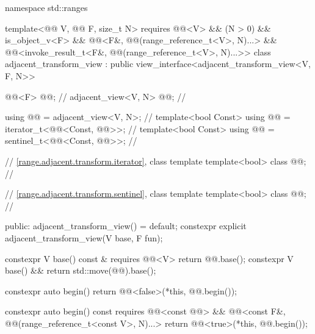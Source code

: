 %
%
%
%
%
%
\begin{codeblock}
namespace std::ranges {
  template<@@ V, @@ F, size_t N>
    requires @@<V> && (N > 0) && is_object_v<F> &&
             @@<F&, @@(range_reference_t<V>, N)...> &&
             @@<invoke_result_t<F&, @@(range_reference_t<V>, N)...>>
  class adjacent_transform_view : public view_interface<adjacent_transform_view<V, F, N>> {
    @@<F> @@;                        // \expos
    adjacent_view<V, N> @@;                 // \expos

    using @@ = adjacent_view<V, N>;      // \expos
    template<bool Const>
      using @@ = iterator_t<@@<Const, @@>>;         // \expos
    template<bool Const>
      using @@ = sentinel_t<@@<Const, @@>>;         // \expos

    // \ref{range.adjacent.transform.iterator}, class template 
    template<bool> class @@;              // \expos

    // \ref{range.adjacent.transform.sentinel}, class template 
    template<bool> class @@;              // \expos

  public:
    adjacent_transform_view() = default;
    constexpr explicit adjacent_transform_view(V base, F fun);

    constexpr V base() const & requires @@<V> { return @@.base(); }
    constexpr V base() && { return std::move(@@).base(); }

    constexpr auto begin() {
      return @@<false>(*this, @@.begin());
    }

    constexpr auto begin() const
      requires @@<const @@> &&
               @@<const F&, @@(range_reference_t<const V>, N)...> {
      return @@<true>(*this, @@.begin());
    }

}}
\end{codeblock}
